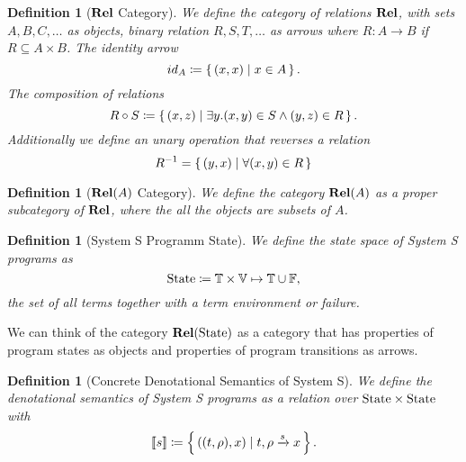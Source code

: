 \documentclass{article}
\newtheorem{definition}[theorem]{Definition}
\newcommand{\transformx}[4]{#1, #2 \xrightarrow{#3} #4}
\newcommand{\Term}{\ensuremath \mathbb{T}}
\newcommand{\Fail}{\ensuremath \mathbb{F}}
\newcommand{\Var}{\ensuremath \mathbb{V}}
\newcommand{\Env}{\ensuremath \Var \mapsto \Term}
\newcommand{\sem}[1]{\ensuremath \llbracket #1 \rrbracket}
\newcommand{\State}{\ensuremath \text{State}}
\newcommand{\setbuild}[2]{\ensuremath \left\{\, #1 \mid #2 \,\right\}}
\newcommand{\Rel}{\ensuremath \mathbf{Rel}}
\begin{document}
\begin{definition}[$\Rel$ Category] \normalfont
  We define the category of relations $\Rel$, with sets $A,B,C, \ldots$ as objects, binary relation $R,S,T, \ldots$ as arrows where $R: A \rightarrow B$ if $R \subseteq A \times B$. The identity arrow \[id_A \coloneqq \setbuild{ (x,x) }{ x \in A }.\] The composition of relations \[R \circ S \coloneqq \setbuild{(x,z)}{ \exists y. (x,y) \in S \land (y,z) \in R }.\] Additionally we define an unary operation that reverses a relation \[ R^{-1} = \setbuild{(y,x)}{ \forall (x,y) \in R } \]   
\end{definition}

\begin{definition}[$\Rel(A)$ Category] \normalfont
  We define the category $\Rel(A)$ as a proper subcategory of $\Rel$, where the all the objects are subsets of $A$.
\end{definition}

\begin{definition}[System S Programm State] \normalfont
  We define the state space of System S programs as \[\State \coloneqq \Term \times \Env \cup \Fail,\] the set of all terms together with a term environment or failure.
\end{definition}

We can think of the category $\Rel(\State)$ as a category that has properties of program states as objects and properties of program transitions as arrows.

\begin{definition}[Concrete Denotational Semantics of System S] \normalfont
  We define the denotational semantics of System S programs as a relation over $\State \times \State$ with \[\sem{s} \coloneqq \setbuild{((t,\rho),x)}{\transformx{t}{\rho}{s}{x}}.\]
\end{definition}
\end{document}
